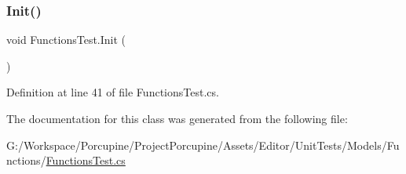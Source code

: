 \subsubsection{\texorpdfstring{Init()}{Init()}}
{\footnotesize\ttfamily void Functions\+Test.\+Init (\begin{DoxyParamCaption}{ }\end{DoxyParamCaption})}



Definition at line 41 of file Functions\+Test.\+cs.



The documentation for this class was generated from the following file\+:\begin{DoxyCompactItemize}
\item 
G\+:/\+Workspace/\+Porcupine/\+Project\+Porcupine/\+Assets/\+Editor/\+Unit\+Tests/\+Models/\+Functions/\hyperlink{_functions_test_8cs}{Functions\+Test.\+cs}\end{DoxyCompactItemize}

